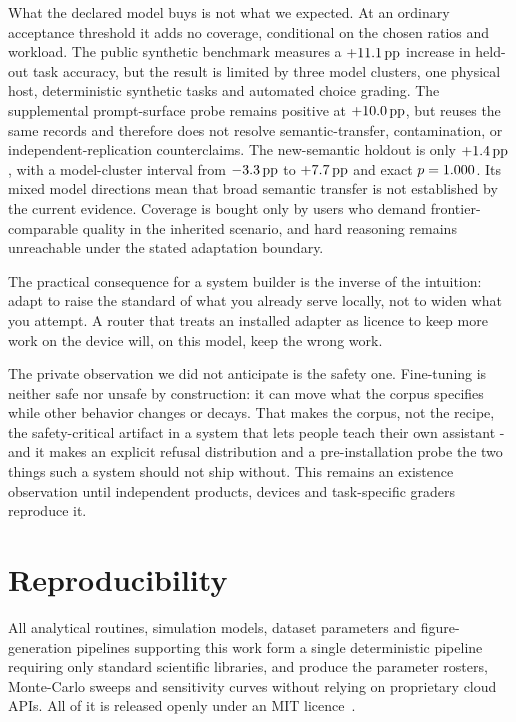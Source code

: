 \documentclass[conference]{IEEEtran}
\newcommand{\pp}{\,\text{pp}}
\begin{document}
What the declared model buys is not what we expected. At an ordinary acceptance
threshold it adds no coverage, conditional on the chosen ratios and workload.
The public synthetic benchmark measures a $+\AdaptationUplift\pp$ increase in
held-out task accuracy, but the result is limited by three model clusters, one
physical host, deterministic synthetic tasks and automated choice grading.
The supplemental prompt-surface probe remains positive at
$+\AdaptationHoldoutUplift\pp$, but reuses the same records and therefore does
not resolve semantic-transfer, contamination, or independent-replication
counterclaims.
The new-semantic holdout is only $+\AdaptationSemanticUplift\pp$, with a
model-cluster interval from $\AdaptationSemanticUpliftLow\pp$ to
$+\AdaptationSemanticUpliftHigh\pp$ and exact $p=1.000$.
Its mixed model directions mean that broad semantic transfer is not
established by the current evidence.
Coverage is bought only by users who demand frontier-comparable quality in the
inherited scenario, and hard reasoning remains unreachable under the stated
adaptation boundary.

The practical consequence for a system builder is the inverse of the intuition:
adapt to raise the standard of what you already serve locally, not to widen what
you attempt. A router that treats an installed adapter as licence to keep more
work on the device will, on this model, keep the wrong work.

The private observation we did not anticipate is the safety one. Fine-tuning is
neither safe nor unsafe by construction: it can move what the corpus specifies
while other behavior changes or decays. That makes the corpus, not the recipe,
the safety-critical artifact in a system that lets people teach their own
assistant - and it makes an explicit refusal distribution and a pre-installation
probe the two things such a system should not ship without. This remains an
existence observation until independent products, devices and task-specific
graders reproduce it.

\section*{Reproducibility}
All analytical routines, simulation models, dataset parameters and
figure-generation pipelines supporting this work form a single deterministic
pipeline requiring only standard scientific libraries, and produce the
parameter rosters, Monte-Carlo sweeps and sensitivity curves without relying
on proprietary cloud APIs. All of it is released openly under an MIT
licence~\cite{autoyou2026measure}.
\end{document}
